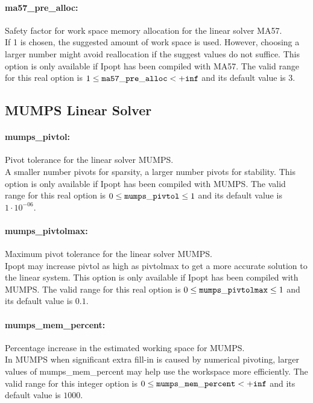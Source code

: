 \paragraph{ma57\_pre\_alloc:}\label{sec:ma57_pre_alloc} Safety factor for work space memory allocation for the linear solver MA57. $\;$ \\
 If 1 is chosen, the suggested amount of work
space is used.  However, choosing a larger number
might avoid reallocation if the suggest values do
not suffice.  This option is only available if
Ipopt has been compiled with MA57. The valid range for this real option is 
$1 \le {\tt ma57\_pre\_alloc } <  {\tt +inf}$
and its default value is $3$.


\subsection{MUMPS Linear Solver}

\paragraph{mumps\_pivtol:}\label{sec:mumps_pivtol} Pivot tolerance for the linear solver MUMPS. $\;$ \\
 A smaller number pivots for sparsity, a larger
number pivots for stability.  This option is only
available if Ipopt has been compiled with MUMPS. The valid range for this real option is 
$0 \le {\tt mumps\_pivtol } \le 1$
and its default value is $1 \cdot 10^{-06}$.


\paragraph{mumps\_pivtolmax:}\label{sec:mumps_pivtolmax} Maximum pivot tolerance for the linear solver MUMPS. $\;$ \\
 Ipopt may increase pivtol as high as pivtolmax to
get a more accurate solution to the linear
system.  This option is only available if Ipopt
has been compiled with MUMPS. The valid range for this real option is 
$0 \le {\tt mumps\_pivtolmax } \le 1$
and its default value is $0.1$.


\paragraph{mumps\_mem\_percent:}\label{sec:mumps_mem_percent} Percentage increase in the estimated working space for MUMPS. $\;$ \\
 In MUMPS when significant extra fill-in is caused
by numerical pivoting, larger values of
mumps\_mem\_percent may help use the workspace
more efficiently. The valid range for this integer option is
$0 \le {\tt mumps\_mem\_percent } <  {\tt +inf}$
and its default value is $1000$.


